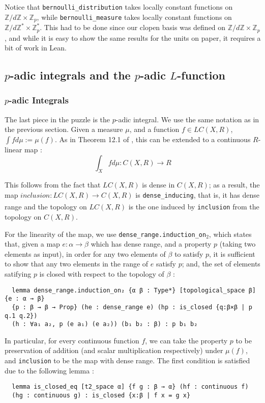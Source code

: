 \documentclass[a4paper,UKenglish,cleveref, autoref, thm-restate]{lipics-v2021}
\newcommand{\lean}[1]{\texttt{#1}\xspace} %
\begin{document}
Notice that \lean{bernoulli\_distribution} takes locally constant functions on $\mathbb{Z}/d \mathbb{Z} \times \mathbb{Z}_p$, 
while \newline \lean{bernoulli\_measure} takes locally constant functions on $\mathbb{Z}/d \mathbb{Z}^* \times \mathbb{Z}_p^*$. This had to be done since our clopen basis was defined on 
$\mathbb{Z}/d \mathbb{Z} \times \mathbb{Z}_p$, and while it is easy to show the same results for the units on paper, it requires a bit of work in Lean.

\subsection{$p$-adic integrals and the $p$-adic $L$-function}
\subsubsection{$p$-adic Integrals}
The last piece in the puzzle is the $p$-adic integral. We use the same notation as in the previous
section. Given a measure $\mu$, and a function $f \in LC(X, R)$,
$\int f d\mu := \mu(f)$. As in Theorem 12.1 of \cite{cyc}, this can be extended to a
continuous $R$-linear map :
$$ \int_X f d\mu : C(X, R) \xrightarrow[]{} R $$

This follows from the fact that $LC(X, R)$ is dense in $C(X, R)$; as a result, the map 
\newline $inclusion : LC(X, R) \xrightarrow[]{} C(X, R)$
is \lean{dense\_inducing}, that is, it has dense range and the topology on $LC(X, R)$ is the one
induced by \lean{inclusion} from the topology on $C(X,R)$. 

For the linearity of the map, we use \lean{dense\_range.induction\_on$_2$}, which states that, given a map $e : \alpha \to \beta$ which has dense range, 
and a property $p$ (taking two elements as input), in order for any two elements of $\beta$ to satisfy $p$, it is sufficient to show that any two elements 
in the range of $e$ satisfy $p$; and, the set of elements satifying $p$ is closed with respect to the topology of $\beta$ :
\begin{lstlisting}
  lemma dense_range.induction_on₂ {α β : Type*} [topological_space β] {e : α → β} 
  {p : β → β → Prop} (he : dense_range e) (hp : is_closed {q:β×β | p q.1 q.2}) 
  (h : ∀a₁ a₂, p (e a₁) (e a₂)) (b₁ b₂ : β) : p b₁ b₂
\end{lstlisting}

In particular, for every continuous function $f$, we can take the property $p$ to be preservation of addition (and scalar multiplication respectively) under 
$\mu (f)$, and \lean{inclusion} to be the map with dense range. The first condition is satisfied due to the following lemma :
\begin{lstlisting}
  lemma is_closed_eq [t2_space α] {f g : β → α} (hf : continuous f) 
  (hg : continuous g) : is_closed {x:β | f x = g x}
\end{lstlisting}
\end{document}
